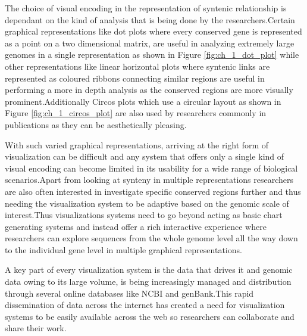 The choice of visual encoding in the representation of syntenic relationship is dependant on the kind of analysis that is being done by the researchers.Certain graphical representations like dot plots where every conserved gene is represented as a point on a two dimensional matrix, are useful in analyzing extremely large genomes in a single representation as shown in Figure \ref{fig:ch_1_dot_plot} while other representations like linear horizontal plots where syntenic links are represented as coloured ribbons connecting similar regions are useful in performing a more in depth analysis as the conserved regions are more visually prominent.Additionally Circos plots which use a circular layout as shown in Figure \ref{fig:ch_1_circos_plot} are also used by researchers commonly in publications as they can be aesthetically pleasing.

With such varied graphical representations, arriving at the right form of visualization can be difficult and any system that offers only a single kind of visual encoding can become limited in its usability for a wide range of biological scenarios.Apart from looking at synteny in multiple representations researchers are also often interested in  investigate specific conserved regions further and thus needing the visualization system to be adaptive based on the genomic scale of interest.Thus visualizations systems need to go beyond acting as basic chart generating systems and instead offer a rich interactive experience where researchers can explore sequences from the whole genome level all the way down to the individual gene level in multiple graphical representations.

A key part of every visualization system is the data that drives it and genomic data owing to its large volume, is being increasingly managed and distribution through several online databases like NCBI and genBank.This rapid dissemination of data across the internet has created a need for visualization systems to be easily available across the web so researchers can collaborate and share their work.


